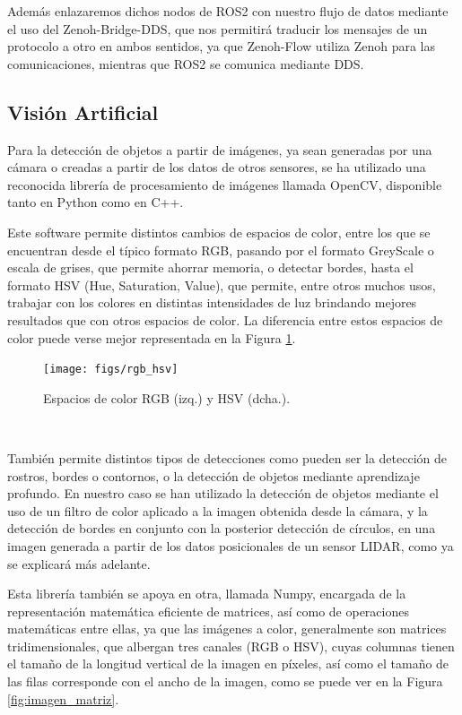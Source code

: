 Además enlazaremos dichos nodos de ROS2 con nuestro flujo de datos mediante el
uso del Zenoh-Bridge-DDS, que nos permitirá traducir los mensajes de un
protocolo a otro en ambos sentidos, ya que Zenoh-Flow utiliza Zenoh para las
comunicaciones, mientras que ROS2 se comunica mediante DDS.


\subsection{Visión Artificial}
\label{sec:vision_artificial}

Para la detección de objetos a partir de imágenes, ya sean generadas por una
cámara o creadas a partir de los datos de otros sensores, se ha utilizado una
reconocida librería de procesamiento de imágenes llamada OpenCV, disponible
tanto en Python como en C++.

Este software permite distintos cambios de espacios de color, entre los que se
encuentran desde el típico formato RGB, pasando por el formato GreyScale o
escala de grises, que permite ahorrar memoria, o detectar bordes, hasta el
formato HSV (Hue, Saturation, Value), que permite, entre otros muchos usos,
trabajar con los colores en distintas intensidades de luz brindando mejores
resultados que con otros espacios de color.
La diferencia entre estos espacios de color puede verse mejor representada en la
Figura \ref{fig:rgb_hsv}.

\begin{figure} [h!]
  \begin{center}
    \texttt{[image: figs/rgb\_hsv]}
  \end{center}
  \caption{Espacios de color RGB (izq.) y HSV (dcha.).}
  \label{fig:rgb_hsv}
\end{figure}\

También permite distintos tipos de detecciones como pueden ser la detección de
rostros, bordes o contornos, o la detección de objetos mediante aprendizaje
profundo.
En nuestro caso se han utilizado la detección de objetos mediante el uso de un
filtro de color aplicado a la imagen obtenida desde la cámara, y la detección de
bordes en conjunto con la posterior detección de círculos, en una imagen
generada a partir de los datos posicionales de un sensor LIDAR, como ya se
explicará más adelante.

Esta librería también se apoya en otra, llamada Numpy, encargada de la
representación matemática eficiente de matrices, así como de operaciones
matemáticas entre ellas, ya que las imágenes a color, generalmente son matrices
tridimensionales, que albergan tres canales (RGB o HSV), cuyas columnas tienen
el tamaño de la longitud vertical de la imagen en píxeles, así como el tamaño de
las filas corresponde con el ancho de la imagen, como se puede ver en la Figura
\ref{fig:imagen_matriz}.

